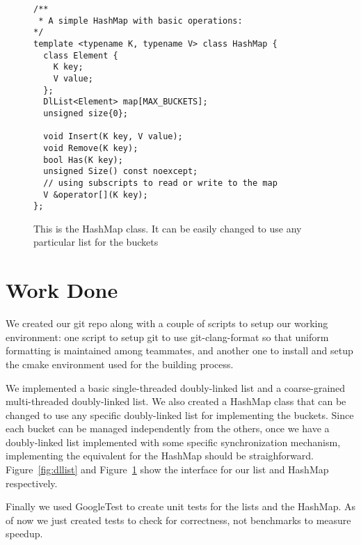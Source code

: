\documentclass[11pt]{article}
\begin{document}
\begin{figure}
\begin{center}
\begin{lstlisting}
/**
 * A simple HashMap with basic operations:
*/
template <typename K, typename V> class HashMap {
  class Element {
    K key;
    V value;
  };
  DlList<Element> map[MAX_BUCKETS];
  unsigned size{0};

  void Insert(K key, V value);
  void Remove(K key);
  bool Has(K key);
  unsigned Size() const noexcept;
  // using subscripts to read or write to the map
  V &operator[](K key);  
};
\end{lstlisting}
\caption{
This is the HashMap class. It can be easily changed to use any particular list for the buckets}
\label{fig:hashmap}
\end{center}
\end{figure}

\section*{Work Done}
We created our git repo along with a couple of scripts to setup our working
environment: one script to setup git to use git-clang-format so that uniform
formatting is maintained among teammates, and another one to install and setup the cmake environment used for
the building process. 

We implemented a basic single-threaded doubly-linked list and a coarse-grained multi-threaded
doubly-linked list. We also created a HashMap class that can be changed to use any 
specific doubly-linked list for implementing the buckets. Since each bucket can be managed 
independently from the others, once we have a doubly-linked list implemented with some specific 
synchronization mechanism, implementing the equivalent for the HashMap should be straighforward.  Figure~\ref{fig:dllist} and Figure~\ref{fig:hashmap} show the interface for our list and HashMap respectively.

Finally we used GoogleTest to create unit tests for the lists and the HashMap. As of now we just created
tests to check for correctness, not benchmarks to measure speedup.
\end{document}
